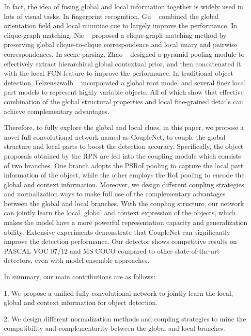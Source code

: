 \documentclass[10pt,twocolumn,letterpaper]{article}
\begin{document}
In fact, the idea of fusing global and local information together is widely used in lots of visual tasks. In fingerprint recognition, Gu \etal~\cite{gu2006fingerprint} combined the global orientation field and local minutiae cue to largely improve the performance. In clique-graph matching, Nie \etal~\cite{nie2015clique} proposed a clique-graph matching method by preserving global clique-to-clique correspondence and local unary and pairwise correspondences. In scene parsing, Zhao \etal~\cite{zhao2016pyramid} designed a pyramid pooling module to effectively extract hierarchical global contextual prior, and then concatenated it with the local FCN feature to improve the performance. In traditional object detection, Felzenszwalb \etal~\cite{felzenszwalb2010object} incorporated a global root model and several finer local part models to represent highly variable objects. All of which show that effective combination of the global structural properties and local fine-grained details can achieve complementary advantages.

Therefore, to fully explore the global and local clues, in this paper, we propose a novel full convolutional network named as CoupleNet, to couple the global structure and local parts to boost the detection accuracy.
Specifically, the object proposals obtained by the RPN are fed into the coupling module which consists of two branches. One branch adopts the PSRoI pooling to capture the local part information of the object, while the other employs the RoI pooling to encode the global and context information. Moreover, we design different coupling strategies and normalization ways to make full use of the complementary advantages between the global and local branches. With the coupling structure, our network can jointly learn the local, global and context expression of the objects, which makes the model have a more powerful representation capacity and generalization ability. Extensive experiments demonstrate that CoupleNet can significantly improve the detection performance. Our detector shows competitive results on PASCAL VOC 07/12 and MS COCO compared to other state-of-the-art detectors, even with model ensemble approaches.

In summary, our main contributions are as follows:

1. We propose a unified fully convolutional network to jointly learn the local, global and context information for object detection.

2. We design different normalization methods and coupling strategies to mine the compatibility and complementarity between the global and local branches.
\end{document}
